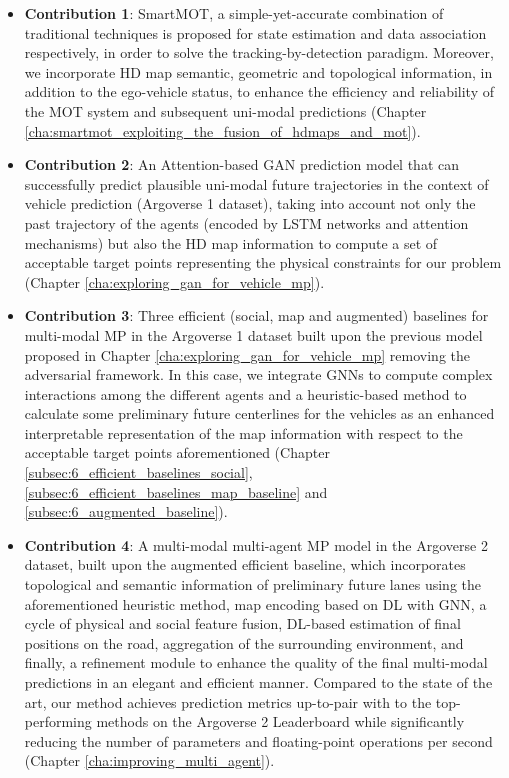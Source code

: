 \begin{itemize}
	
	\item \textbf{Contribution 1}: SmartMOT, a simple-yet-accurate combination of traditional techniques is proposed for state estimation and data association respectively, in order to solve the tracking-by-detection paradigm. Moreover, we incorporate HD map semantic, geometric and topological information, in addition to the ego-vehicle status, to enhance the efficiency and reliability of the \ac{MOT} system and subsequent uni-modal predictions (Chapter \ref{cha:smartmot_exploiting_the_fusion_of_hdmaps_and_mot}).
	
	\item \textbf{Contribution 2}: An Attention-based \ac{GAN} prediction model that can successfully predict plausible uni-modal future trajectories in the context of vehicle prediction (Argoverse 1 dataset), taking into account not only the past trajectory of the agents (encoded by \ac{LSTM} networks and attention mechanisms) but also the HD map information to compute a set of acceptable target points representing the physical constraints for our problem (Chapter \ref{cha:exploring_gan_for_vehicle_mp}).
	
	\item \textbf{Contribution 3}: Three efficient (social, map and augmented) baselines for multi-modal \ac{MP} in the Argoverse 1 dataset built upon the previous model proposed in Chapter \ref{cha:exploring_gan_for_vehicle_mp} removing the adversarial framework. In this case, we integrate \acp{GNN} to compute complex interactions among the different agents and a heuristic-based method to calculate some preliminary future centerlines for the vehicles as an enhanced interpretable representation of the map information with respect to the acceptable target points aforementioned (Chapter \ref{subsec:6_efficient_baselines_social}, \ref{subsec:6_efficient_baselines_map_baseline} and \ref{subsec:6_augmented_baseline}). 
	
	\item \textbf{Contribution 4}: A multi-modal multi-agent \ac{MP} model in the Argoverse 2 dataset, built upon the augmented efficient baseline, which incorporates topological and semantic information of preliminary future lanes using the aforementioned heuristic method, map encoding based on \ac{DL} with \ac{GNN}, a cycle of physical and social feature fusion, \ac{DL}-based estimation of final positions on the road, aggregation of the surrounding environment, and finally, a refinement module to enhance the quality of the final multi-modal predictions in an elegant and efficient manner. Compared to the state of the art, our method achieves prediction metrics up-to-pair with to the top-performing methods on the Argoverse 2 Leaderboard while significantly reducing the number of parameters and floating-point operations per second (Chapter \ref{cha:improving_multi_agent}).
	

\end{itemize}
